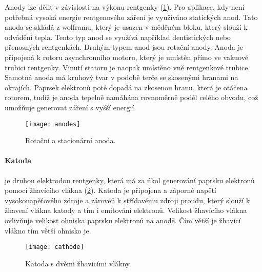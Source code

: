 Anody lze dělit v závislosti na výkonu rentgenky (\cref{fig:anodes}). Pro aplikace, kdy není potřebná vysoká energie rentgenového záření je využíváno statických anod. Tato anoda se skládá z wolframu, který je usazen v měděném bloku, který slouží k odvádění tepla. Tento typ anod se využívá například dentistických nebo přenosných rentgenkách. Druhým typem anod jsou rotační anody. Anoda je připojená k rotoru asynchronního motoru, který je umístěn přímo ve vakuové trubici rentgenky. Vinutí statoru je naopak umístěno vně rentgenkové trubice. Samotná anoda má kruhový tvar v podobě terče se skosenými hranami na okrajích. Paprsek elektronů poté dopadá na zkosenou hranu, která je otáčena rotorem, tudíž je anoda tepelně namáhána rovnoměrně podél celého obvodu, což umožňuje generovat záření s vyšší energií. \cite{Diagnostic-Radiology-Physics}

\begin{figure}[hb]
\centering
\texttt{[image: anodes]}
\caption{Rotační a stacionární anoda. \cite{the-xray-beam}}
\label{fig:anodes}
\end{figure}


\paragraph{Katoda}
je druhou elektrodou rentgenky, která má za úkol generování paprsku elektronů pomocí žhavícího vlákna (\cref{fig:cathode}). Katoda je připojena a záporné napětí vysokonapěťového zdroje a zároveň k střídavému zdroji proudu, který slouží k žhavení vlákna katody a tím i emitování elektronů.\cite{Diagnostic-Radiology-Physics} Velikost žhavícího vlákna ovlivňuje velikost ohniska paprsku elektronů na anodě. Čím větší je žhavící vlákno tím větší ohnisko je.

\begin{figure}[hb]
\centering
\texttt{[image: cathode]}
\caption{Katoda s dvěmi žhavícími vlákny. \cite{the-xray-beam}}
\label{fig:cathode}
\end{figure}
